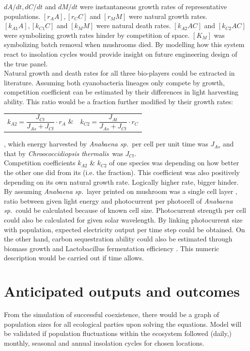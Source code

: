 \documentclass[a4paper, 11pt]{article}
\newcommand{\As}{\textit{Anabaena sp.}}
\newcommand{\Ct}{\textit{Chroococcidiopsis thermalis}}
\begin{document}
$dA/dt, dC/dt$ and $dM/dt$ were instantaneous growth rates of representative populations.  $[r_A A], [r_C C]$ and $[r_M M]$ were natural growth rates.  $[k_{A1} A], [k_{C1} C]$ and $[k_M M]$ were natural death rates.  $[k_{A2} A C]$ and $[k_{C2} A C]$ were symbolizing growth rates hinder by competition of space.  $[K_M]$ was symbolizing batch removal when mushrooms died.  By modelling how this system react to insolation cycles would provide insight on future engineering design of the true panel.\\
Natural growth and death rates for all three bio-players could be extracted in literature.  Assuming both cyanobacteria lineages only compete by growth, competition coefficient can be estimated by their differences in light harvesting ability.  This ratio would be a fraction further modified by their growth rates:
\begin{tabular}{cc}
	$k_{A2} = \dfrac{J_{Ct}}{J_{As} + J_{Ct}}\cdot r_A$ \&& $k_{C2} = \dfrac{J_{At}}{J_{As} + J_{Ct}}\cdot r_C$
\end{tabular}, which energy harvested by \As\ per cell per unit time was $J_{As}$ and that by \Ct\ was $J_{Ct}$.\\
Competition coefficients $k_{A2}$ \& $k_{C2}$ of one species was depending on how better the other one did from its (i.e. the fraction).  This coefficient was also positively depending on its own natural growth rate.  Logically higher rate, bigger hinder.\\
By assuming \As\ layer printed on mushroom was a single cell layer \autocite{joshi2018bacterial}, ratio between given light energy and photocurrent per photocell of \As\ could be calculated because of known cell size.  Photocurrent strength per cell could also be calculated for given solar wavelength.  By linking photocurrent size with population, expected electricity output per time step could be obtained.  On the other hand, carbon sequestration ability could also be estimated through biomass growth \autocite{markou2014microalgal} and Lactobacillus fermentation efficiency \autocite{senthuran1997lactic}.  This numeric description would be carried out if time allows.

\section{Anticipated outputs and outcomes}
From the simulation of successful coexistence, there would be a graph of population sizes for all ecological parties upon solving the equations.  Model will be validated if population fluctuations within the ecosystem followed (daily,) monthly, seasonal and annual insolation cycles for chosen locations.
\end{document}

